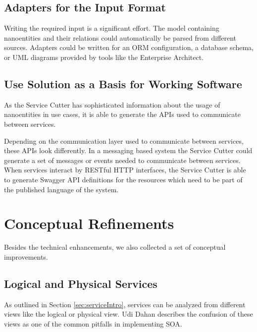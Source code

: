 \subsection{Adapters for the Input Format}

Writing the required input is a significant effort. The model containing nanoentities and their relations could automatically be parsed from different sources. Adapters could be written for an \gls{ORM} configuration, a database schema, or \gls{UML} diagrams provided by tools like the Enterprise Architect\cite{entArch}.


\subsection{Use Solution as a Basis for Working Software}

As the Service Cutter has sophisticated information about the usage of nanoentities in use cases, it is able to generate the APIs used to communicate between services. 

Depending on the communication layer used to communicate between services, these \gls{API}s look differently. In a messaging based system the Service Cutter could generate a set of messages or events needed to communicate between services. When services interact by RESTful HTTP interfaces, the Service Cutter is able to generate Swagger\cite{swagger} \gls{API} definitions for the resources which need to be part of the published language of the system. 

\section{Conceptual Refinements}

Besides the technical enhancements, we also collected a set of conceptual improvements.

\subsection{Logical and Physical Services}

As outlined in Section \ref{sec:serviceIntro}, services can be analyzed from different views like the logical or physical view. Udi Dahan describes the confusion of these views as one of the common pitfalls in implementing \gls{SOA}\cite{udiViews}.

